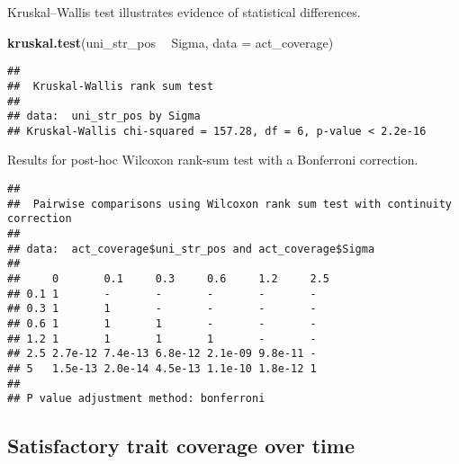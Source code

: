 \documentclass[]{book}
\newenvironment{Shaded}{\begin{snugshade}}{\end{snugshade}}
\newcommand{\DataTypeTok}[1]{\textcolor[rgb]{0.13,0.29,0.53}{#1}}
\newcommand{\KeywordTok}[1]{\textcolor[rgb]{0.13,0.29,0.53}{\textbf{#1}}}
\newcommand{\NormalTok}[1]{#1}
\newcommand{\OperatorTok}[1]{\textcolor[rgb]{0.81,0.36,0.00}{\textbf{#1}}}
\newcommand{\OtherTok}[1]{\textcolor[rgb]{0.56,0.35,0.01}{#1}}
\newcommand{\StringTok}[1]{\textcolor[rgb]{0.31,0.60,0.02}{#1}}
\begin{document}
Kruskal--Wallis test illustrates evidence of statistical differences.

\begin{Shaded}
\begin{Highlighting}[]
\KeywordTok{kruskal.test}\NormalTok{(uni_str_pos }\OperatorTok{~}\StringTok{ }\NormalTok{Sigma, }\DataTypeTok{data =}\NormalTok{ act_coverage)}
\end{Highlighting}
\end{Shaded}

\begin{verbatim}
## 
##  Kruskal-Wallis rank sum test
## 
## data:  uni_str_pos by Sigma
## Kruskal-Wallis chi-squared = 157.28, df = 6, p-value < 2.2e-16
\end{verbatim}

Results for post-hoc Wilcoxon rank-sum test with a Bonferroni correction.

\begin{Shaded}
\end{Shaded}

\begin{verbatim}
## 
##  Pairwise comparisons using Wilcoxon rank sum test with continuity correction 
## 
## data:  act_coverage$uni_str_pos and act_coverage$Sigma 
## 
##     0       0.1     0.3     0.6     1.2     2.5
## 0.1 1       -       -       -       -       -  
## 0.3 1       1       -       -       -       -  
## 0.6 1       1       1       -       -       -  
## 1.2 1       1       1       1       -       -  
## 2.5 2.7e-12 7.4e-13 6.8e-12 2.1e-09 9.8e-11 -  
## 5   1.5e-13 2.0e-14 4.5e-13 1.1e-10 1.8e-12 1  
## 
## P value adjustment method: bonferroni
\end{verbatim}

\hypertarget{satisfactory-trait-coverage-over-time-2}{%
\subsection{Satisfactory trait coverage over time}\label{satisfactory-trait-coverage-over-time-2}}
\end{document}

